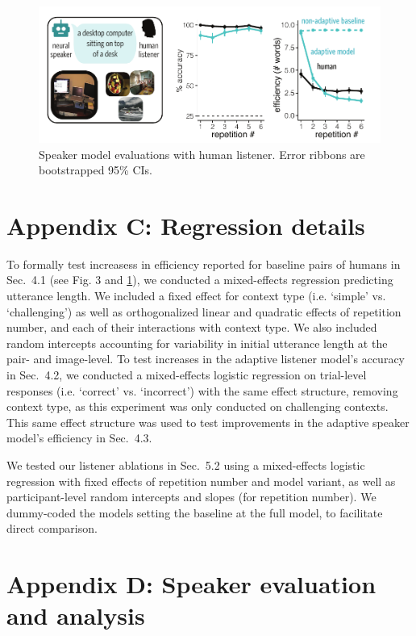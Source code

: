 \documentclass[11pt,a4paper]{article}
\begin{document}
 \begin{figure}[t!]
\centering
\includegraphics[scale=0.9]{../figures/supplementalCurves_conll}
\caption{Speaker model evaluations with human listener. Error ribbons are bootstrapped 95\% CIs.}
\label{fig:supplementalcurves}
\end{figure}

\section*{Appendix C: Regression details}

To formally test increasess in efficiency reported for baseline pairs of humans in Sec.~4.1 (see Fig. 3 and \ref{fig:supplementalcurves}), we conducted a mixed-effects regression predicting utterance length. 
We included a fixed effect for context type (i.e. `simple' vs. `challenging') as well as orthogonalized linear and quadratic effects of repetition number, and each of their interactions with context type. 
We also included random intercepts accounting for variability in initial utterance length at the pair- and image-level.
To test increases in the adaptive listener model's accuracy in Sec.\ 4.2, we conducted a mixed-effects logistic regression on trial-level responses (i.e. `correct' vs. `incorrect') with the same effect structure, removing context type, as this experiment was only conducted on challenging contexts.
This same effect structure was used to test improvements in the adaptive speaker model's efficiency in Sec.~4.3. 

We tested our listener ablations in Sec.\ 5.2 using a mixed-effects logistic regression with fixed effects of repetition number and model variant, as well as participant-level random intercepts and slopes (for repetition number). We dummy-coded the models setting the baseline at the full model, to facilitate direct comparison. 


\section*{Appendix D: Speaker evaluation and analysis}
\end{document}
